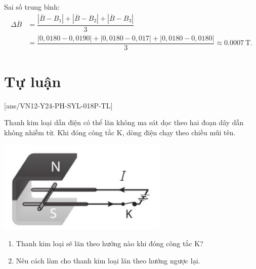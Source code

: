 \begin{ex}
{\begin{center}
\begin{tabular}{|M{2cm}|M{2cm}|M{2cm}|M{2cm}|M{4cm}|M{3.5cm}|}
	\end{tabular}
\end{center}	
Sai số trung bình:
$$\begin{aligned}
	\Delta \overline{B}&=\dfrac{\left|\overline{B}-B_1\right|+\left|\overline{B}-B_2\right|+\left|\overline{B}-B_3\right|}{3}\\
	&=\dfrac{\left|0,0180-0,0190\right|+\left|0,0180-0,017\right|+\left|0,0180-0,0180\right|}{3}\approx\SI{0.0007}{\tesla}.
\end{aligned}$$

}
\end{ex}



\section{Tự luận}
\setcounter{ex}{0}
[ans/VN12-Y24-PH-SYL-018P-TL]
\begin{ex}
Thanh kim loại dẫn điện có thể lăn không ma sát dọc theo hai đoạn dây dẫn không nhiễm từ. Khi đóng công tắc K, dòng điện chạy theo chiều mũi tên.
\begin{center}
	\includegraphics[width=0.3\linewidth]{../figs/VN12-Y24-PH-SYL-018P-8}
\end{center}
\begin{enumerate}[label=\alph*)]
	\item Thanh kim loại sẽ lăn theo hướng nào khi đóng công tắc K?
	\item Nêu cách làm cho thanh kim loại lăn theo hướng ngược lại.
\end{enumerate}
\end{ex}

